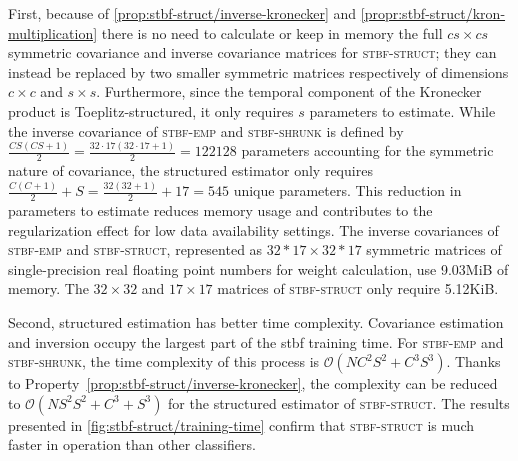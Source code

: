 	First, because of \cref{prop:stbf-struct/inverse-kronecker} and
	\cref{propr:stbf-struct/kron-multiplication} there is no need to calculate or keep in memory the full $cs\times cs$
	symmetric covariance and inverse covariance matrices for \textsc{stbf-struct}; they can instead be replaced by two smaller symmetric matrices respectively of dimensions $c\times c$ and $s\times s$.
	Furthermore, since the temporal component of the Kronecker product is
	Toeplitz-structured, it only requires $s$ parameters to
	estimate.
	While the inverse covariance of \textsc{stbf-emp} and \textsc{stbf-shrunk} is
	defined by $\frac{CS(CS+1)}{2}=\frac{32\cdot17(32\cdot17+1)}{2}=\num{122128}$
	parameters accounting for the symmetric nature of
	covariance, the structured estimator only requires $\frac{C(C+1)}{2} + S =
		\frac{32(32+1)}{2} + 17=545$ unique parameters.
	This reduction in parameters to estimate reduces memory usage and contributes to the regularization effect for low data availability settings.
	The inverse covariances of \textsc{stbf-emp} and
	\textsc{stbf-struct}, represented as $32*17\times 32*17$ symmetric matrices of
	single-precision real floating point numbers for weight calculation,
	use 9.03MiB of memory.
	The $32\times 32$ and $17\times 17$ matrices of \textsc{stbf-struct} only
	require 5.12KiB.

	Second, structured estimation has better time complexity.
	Covariance estimation and inversion occupy the largest part of the \ac{stbf} training time.
	For \textsc{stbf-emp} and \textsc{stbf-shrunk}, the time complexity of this process is $\mathcal{O}(NC^2S^2+C^3S^3)$.
	Thanks to Property~\ref{prop:stbf-struct/inverse-kronecker}, the complexity can be reduced to
	$\mathcal{O}(NS^2S^2+C^3+S^3)$ for the structured estimator of \textsc{stbf-struct}.
	The results presented in \cref{fig:stbf-struct/training-time} confirm that
  \textsc{stbf-struct} is much faster in operation than other classifiers.

